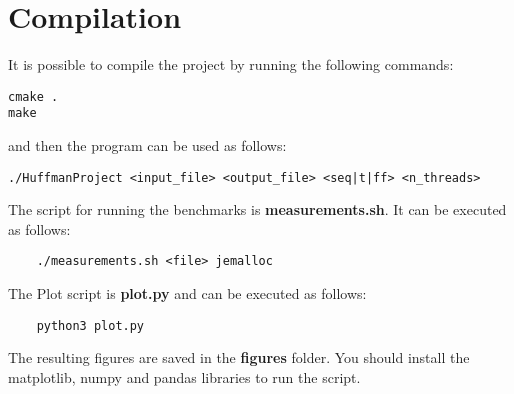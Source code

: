 \documentclass{article}
\begin{document}
\break
\section{Compilation}
It is possible to compile the project by running the following commands:
\begin{verbatim}
cmake .
make
\end{verbatim}

and then the program can be used as follows:
\begin{verbatim}
./HuffmanProject <input_file> <output_file> <seq|t|ff> <n_threads>
\end{verbatim}

The script for running the benchmarks is \textbf{measurements.sh}.
It can be executed as follows:
\begin{verbatim}
    ./measurements.sh <file> jemalloc
\end{verbatim}

The Plot script is \textbf{plot.py} and can be executed as follows:
\begin{verbatim}
    python3 plot.py
\end{verbatim}

The resulting figures are saved in the \textbf{figures} folder.
You should install the matplotlib, numpy and pandas libraries to run the script.
\end{document}
